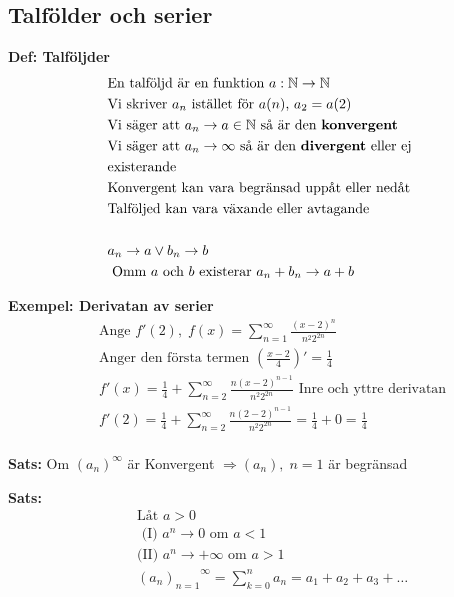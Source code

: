 \begin{multicols}{2}
\section{Talfölder och serier}
\textbf{Def: Talföljder}
\begin{align*}
  &\text{En talföljd är en funktion } a:\mathbb{N}\to\mathbb{N}  \\
  &\text{Vi skriver $a_n$ istället för $a(n)$, $a_2=a(2)$} \\
  &\text{Vi säger att $a_n\to{a}\in\mathbb{N}$ så är den \textbf{konvergent}} \\
  &\text{Vi säger att $a_n\to\infty$ så är den \textbf{divergent} eller ej} \\
  &\text{existerande} \\
  &\text{Konvergent kan vara begränsad uppåt eller nedåt} \\
  &\text{Talföljed kan vara växande eller avtagande} \\
  &\\
  &a_n\to{a}\lor{b_n\to{b}} \\
  &\text{ Omm $a$ och $b$ existerar } a_n+b_n\to{a+b} \\
\end{align*}

\textbf{Exempel: Derivatan av serier}
\begin{align*}
  &\quad  \text{Ange } f'(2), \; f(x)= \displaystyle\sum_{n=1}^{\infty} \frac{{(x-2)}^n}{n^2 2^{2n}} \\
  &\quad  \text{Anger den första termen } \left( \frac{x-2}{4} \right)' = \frac{1}{4} \\
  &\quad  f'(x) = \frac{1}{4} + \displaystyle\sum_{n=2}^{\infty} \frac{n{(x-2)}^{n-1}}{n^2 2^{2n}}
  \text{ Inre och yttre derivatan} \\
  &\quad  f'(2) =  \frac{1}{4} + \displaystyle\sum_{n=2}^{\infty} \frac{n{(2-2)}^{n-1}}{n^2 2^{2n}}
  = \frac{1}{4} + 0 = \frac{1}{4} \\
\end{align*}


\textbf{Sats: }
Om ${(a_n)}^{\infty}$ är Konvergent $\Rightarrow (a_n), \; n=1$ är begränsad

  \textbf{Sats: }
  \begin{align*}
    &\quad  \text{Låt } a>0  \\
    &\quad  \text{ (I) } a^n\to{0} \text{ om } a<1 \\
    &\quad  \text{(II) } a^n\to{+\infty} \text{ om } a>1 \\
    &\quad  {{(a_n)}_{n=1}}^{\infty}=\displaystyle\sum_{k=0}^{n}a_n=a_1+a_2+a_3+\ldots \\
  \end{align*}


\end{multicols}
